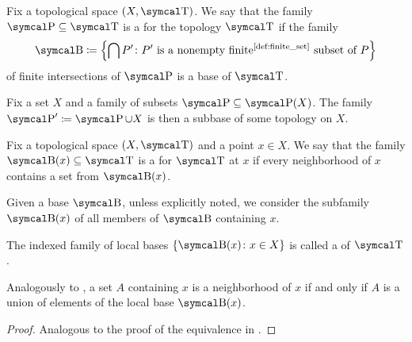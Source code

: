 \begin{definition}\label{def:topological_subbase}\cite[12]{Engelking1989}
  Fix a topological space \( (X, \CT) \). We say that the family \( \CP \subseteq \CT \) is a  for the topology \( \CT \) if the family
  \begin{equation*}
    \CB \coloneqq \left\{ \bigcap P' \colon P' \text{ is a nonempty finite\Tinyref{def:finite_set} subset of } P \right\}
  \end{equation*}
  of finite intersections of \( \CP \) is a base of \( \CT \).
\end{definition}

\begin{proposition}\label{thm:subbase_from_arbitrary_family}
  Fix a set \( X \) and a family of subsets \( \CP \subseteq \Power(X) \). The family \( \CP' \coloneqq \CP \cup X \) is then a subbase of some topology on \( X \).
\end{proposition}

\begin{definition}\label{def:topological_local_base}\cite[12]{Engelking1989}
  Fix a topological space \( (X, \CT) \) and a point \( x \in X \). We say that the family \( \CB(x) \subseteq \CT \) is a  for \( \CT \) at \( x \) if every neighborhood of \( x \) contains a set from \( \CB(x) \).

  Given a base \( \CB \), unless explicitly noted, we consider the subfamily \( \CB(x) \) of all members of \( \CB \) containing \( x \).

  The indexed family of local bases \( \{ \CB(x) \colon x \in X \} \) is called a  of \( \CT \).
\end{definition}

\begin{proposition}\label{thm:neighborhood_iff_union_in_topological_local_base}
  Analogously to , a set \( A \) containing \( x \) is a neighborhood of \( x \) if and only if \( A \) is a union of elements of the local base \( \CB(x) \).
\end{proposition}
\begin{proof}
  Analogous to the proof of the equivalence in .
\end{proof}

